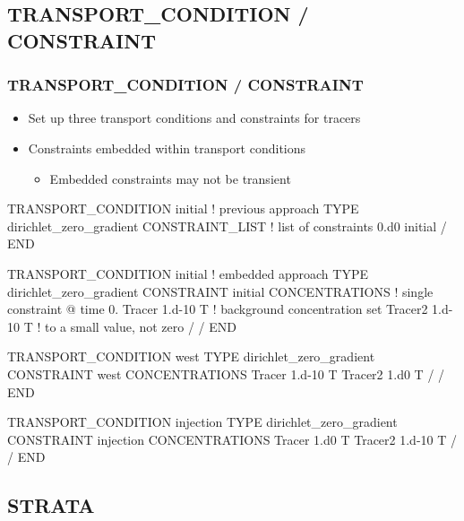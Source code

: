 \documentclass{beamer}
\newcommand\bluecomment[1]{{{\color{blue} #1}}}
\newcommand\magentacomment[1]{{{\color{magenta} #1}}}
\begin{document}
\subsection{TRANSPORT\_CONDITION / CONSTRAINT}

\begin{frame}\frametitle{TRANSPORT\_CONDITION / CONSTRAINT}

\begin{itemize}
  \item Set up three transport conditions and constraints for tracers
  \item Constraints embedded within transport conditions
  \begin{itemize}
    \item Embedded constraints may not be transient
  \end{itemize}
\end{itemize}

\newpage
{
\begin{semiverbatim}

TRANSPORT_CONDITION initial      \bluecomment{! previous approach}
  TYPE dirichlet_zero_gradient
  \magentacomment{CONSTRAINT_LIST       \bluecomment{! list of constraints}
    0.d0 initial  }
  /
END

TRANSPORT_CONDITION initial      \bluecomment{! embedded approach}
  TYPE dirichlet_zero_gradient
  \magentacomment{CONSTRAINT initial
    CONCENTRATIONS      \bluecomment{! single constraint @ time 0.}
      Tracer  1.d-10 T  \bluecomment{! background concentration set}
      Tracer2 1.d-10 T  \bluecomment{!   to a small value, not zero}
    /}
  /
END
\end{semiverbatim}
}

\newpage
{\small
\begin{semiverbatim}
TRANSPORT_CONDITION west
  TYPE dirichlet_zero_gradient
  CONSTRAINT west
    CONCENTRATIONS
      Tracer  1.d-10 T
      Tracer2 1.d0   T
    /
  /
END

TRANSPORT_CONDITION injection
  TYPE dirichlet_zero_gradient
  CONSTRAINT injection
    CONCENTRATIONS
      Tracer  1.d0   T
      Tracer2 1.d-10 T
    /
  /
END
\end{semiverbatim}
}

\end{frame}

\subsection{STRATA}
\end{document}
